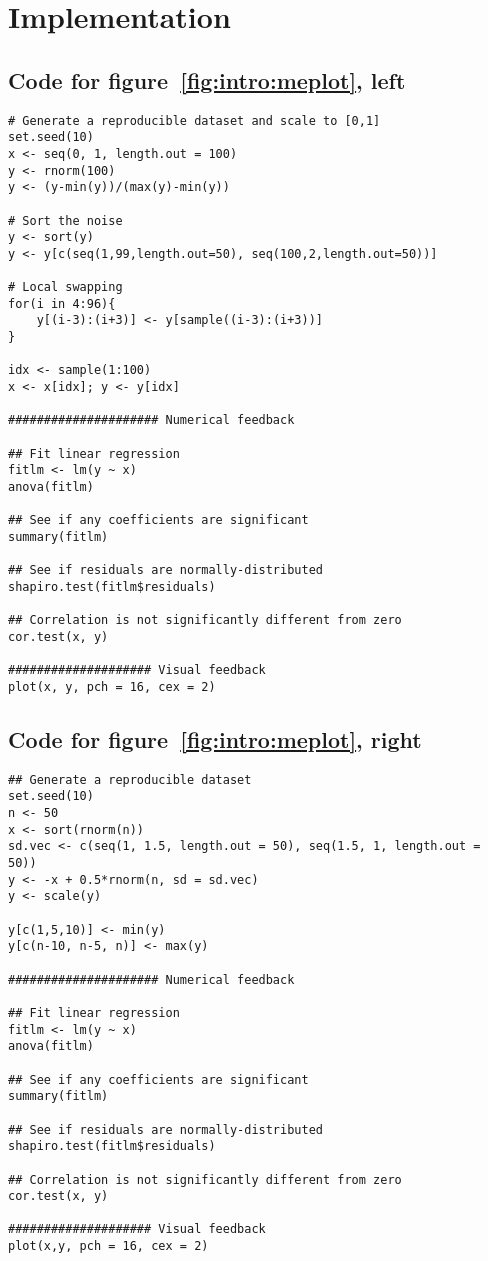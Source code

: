 \chapter{Implementation\label{ch:implementation}}

\lstset{basicstyle=\ttfamily\footnotesize,xleftmargin=0cm,breaklines=true,language=R}

\section{Code for figure~\ref{fig:intro:meplot}, left}
\label{sec:appendicies:me1plot}
{
\begin{lstlisting}
# Generate a reproducible dataset and scale to [0,1]
set.seed(10)
x <- seq(0, 1, length.out = 100)
y <- rnorm(100)
y <- (y-min(y))/(max(y)-min(y))

# Sort the noise
y <- sort(y)
y <- y[c(seq(1,99,length.out=50), seq(100,2,length.out=50))]

# Local swapping
for(i in 4:96){
	y[(i-3):(i+3)] <- y[sample((i-3):(i+3))]
}

idx <- sample(1:100)
x <- x[idx]; y <- y[idx]

##################### Numerical feedback

## Fit linear regression
fitlm <- lm(y ~ x)
anova(fitlm)

## See if any coefficients are significant
summary(fitlm)

## See if residuals are normally-distributed
shapiro.test(fitlm$residuals)

## Correlation is not significantly different from zero
cor.test(x, y)

#################### Visual feedback
plot(x, y, pch = 16, cex = 2)
\end{lstlisting}
}


\section{Code for figure~\ref{fig:intro:meplot}, right}
\label{sec:appendicies:me2plot}
{
\begin{lstlisting}
## Generate a reproducible dataset
set.seed(10)
n <- 50
x <- sort(rnorm(n))
sd.vec <- c(seq(1, 1.5, length.out = 50), seq(1.5, 1, length.out = 50))
y <- -x + 0.5*rnorm(n, sd = sd.vec)
y <- scale(y)

y[c(1,5,10)] <- min(y)
y[c(n-10, n-5, n)] <- max(y)

##################### Numerical feedback

## Fit linear regression
fitlm <- lm(y ~ x)
anova(fitlm)

## See if any coefficients are significant
summary(fitlm)

## See if residuals are normally-distributed
shapiro.test(fitlm$residuals) 

## Correlation is not significantly different from zero
cor.test(x, y)

#################### Visual feedback
plot(x,y, pch = 16, cex = 2)
\end{lstlisting}
}



